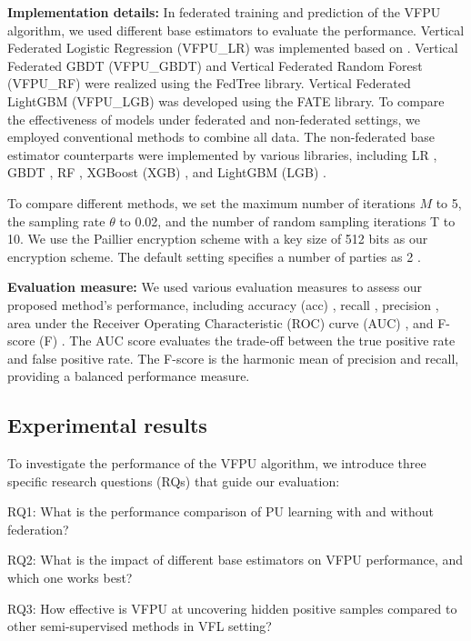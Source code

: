 \documentclass[10pt,journal,compsoc]{IEEEtran}
\begin{document}
\textbf{Implementation details:} In federated training and prediction of the VFPU algorithm, we used different base estimators to evaluate the performance. Vertical Federated Logistic Regression (VFPU\_LR) was implemented based on \cite{aono2016scalable}. Vertical Federated GBDT (VFPU\_GBDT) and Vertical Federated Random Forest (VFPU\_RF) were realized using the FedTree \cite{li2022fedtree} library. Vertical Federated LightGBM (VFPU\_LGB) was developed using the FATE \cite{liu2021fate} library. To compare the effectiveness of models under federated and non-federated settings, we employed conventional methods to combine all data. The non-federated base estimator counterparts were implemented by various libraries, including LR \cite{pedregosa2011scikit}, GBDT \cite{pedregosa2011scikit}, RF \cite{pedregosa2011scikit}, XGBoost (XGB) \cite{chen2015xgboost}, and LightGBM (LGB) \cite{ke2017lightgbm}. 

To compare different methods, we set the maximum number of iterations $M$ to 5, the sampling rate $\theta$ to 0.02, and the number of random sampling iterations T to 10. We use the Paillier encryption scheme with a key size of 512 bits as our encryption scheme. The default setting specifies a number of parties as 2 \cite{li2022fedtree}. 

\textbf{Evaluation measure:} We used various evaluation measures to assess our proposed method's performance, including accuracy (acc) \cite{liu2003building}, recall  \cite{liu2003building}, precision  \cite{liu2003building}, area under the Receiver Operating Characteristic (ROC) curve (AUC) \cite{cheng2021secureboost}, and F-score (F) \cite{cheng2021secureboost}. The AUC score evaluates the trade-off between the true positive rate and false positive rate. The F-score is the harmonic mean of precision and recall, providing a balanced performance measure.
\subsection{Experimental results}
To investigate the performance of the VFPU algorithm, we introduce three specific research questions (RQs) that guide our evaluation:

RQ1: What is the performance comparison of PU learning with and without federation?

RQ2: What is the impact of different base estimators on VFPU performance, and which one works best?

RQ3: How effective is VFPU at uncovering hidden positive samples compared to other semi-supervised methods in VFL setting?
\end{document}
